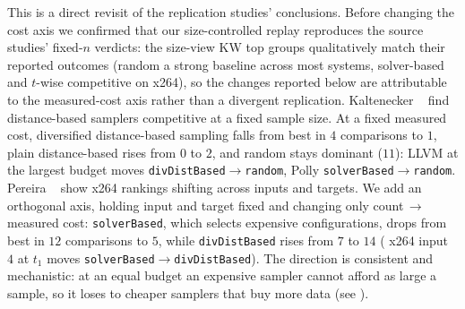 This is a direct revisit of the replication studies' conclusions. Before
changing the cost axis we confirmed that our size-controlled replay reproduces
the source studies' fixed-$n$ verdicts: the size-view KW top groups
qualitatively match their reported outcomes (random a strong baseline across most
\StudyReplicationICSE systems, solver-based and $t$-wise competitive on x264), so
the changes reported below are attributable to the measured-cost axis rather than
a divergent replication. Kaltenecker
\etal\ \cite{kaltenecker2019} find distance-based samplers competitive at a fixed
sample size. At a fixed measured cost, diversified distance-based sampling falls
from best in $4$ comparisons to $1$, plain distance-based rises from $0$ to $2$,
and random stays dominant ($11$): \eg LLVM at the largest budget moves
\texttt{divDistBased}$\to$\texttt{random}, Polly
\texttt{solverBased}$\to$\texttt{random}. Pereira \etal\ \cite{pereira2020} show
x264 rankings shifting across inputs and targets. We add an orthogonal axis,
holding input and target fixed and changing only count\,$\to$\,measured cost:
\texttt{solverBased}, which selects expensive configurations, drops from best in
$12$ comparisons to $5$, while \texttt{divDistBased} rises from $7$ to $14$ (\eg
x264 input~$4$ at $t_1$ moves \texttt{solverBased}$\to$\texttt{divDistBased}). The
direction is consistent and mechanistic: at an equal budget an expensive sampler
cannot afford as large a sample, so it loses to cheaper samplers that buy more
data (see ). %

